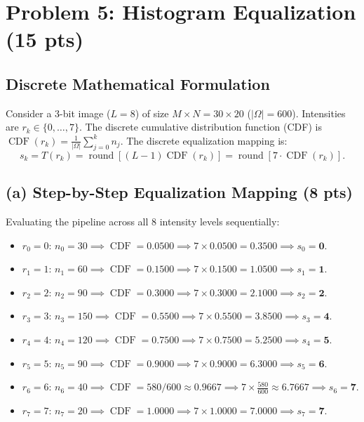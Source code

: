 \documentclass[11pt,a4paper]{article}
\begin{document}
\section{Problem 5: Histogram Equalization (15 pts)}

\subsection{Discrete Mathematical Formulation}
Consider a 3-bit image ($L = 8$) of size $M \times N = 30 \times 20$ ($|\Omega| = 600$). Intensities are $r_k \in \{0, \dots, 7\}$. The discrete cumulative distribution function (CDF) is $\operatorname{CDF}(r_k) = \frac{1}{|\Omega|} \sum_{j=0}^k n_j$. The discrete equalization mapping is:
\begin{equation}
s_k = T(r_k) = \operatorname{round}\left[ (L - 1) \operatorname{CDF}(r_k) \right] = \operatorname{round}\left[ 7 \cdot \operatorname{CDF}(r_k) \right].
\end{equation}

\subsection{(a) Step-by-Step Equalization Mapping (8 pts)}
Evaluating the pipeline across all 8 intensity levels sequentially:
\begin{itemize}
    \item $r_0 = 0: \, n_0 = 30 \implies \operatorname{CDF} = 0.0500 \implies 7 \times 0.0500 = 0.3500 \implies s_0 = \mathbf{0}$.
    \item $r_1 = 1: \, n_1 = 60 \implies \operatorname{CDF} = 0.1500 \implies 7 \times 0.1500 = 1.0500 \implies s_1 = \mathbf{1}$.
    \item $r_2 = 2: \, n_2 = 90 \implies \operatorname{CDF} = 0.3000 \implies 7 \times 0.3000 = 2.1000 \implies s_2 = \mathbf{2}$.
    \item $r_3 = 3: \, n_3 = 150 \implies \operatorname{CDF} = 0.5500 \implies 7 \times 0.5500 = 3.8500 \implies s_3 = \mathbf{4}$.
    \item $r_4 = 4: \, n_4 = 120 \implies \operatorname{CDF} = 0.7500 \implies 7 \times 0.7500 = 5.2500 \implies s_4 = \mathbf{5}$.
    \item $r_5 = 5: \, n_5 = 90 \implies \operatorname{CDF} = 0.9000 \implies 7 \times 0.9000 = 6.3000 \implies s_5 = \mathbf{6}$.
    \item $r_6 = 6: \, n_6 = 40 \implies \operatorname{CDF} = 580/600 \approx 0.9667 \implies 7 \times \frac{580}{600} \approx 6.7667 \implies s_6 = \mathbf{7}$.
    \item $r_7 = 7: \, n_7 = 20 \implies \operatorname{CDF} = 1.0000 \implies 7 \times 1.0000 = 7.0000 \implies s_7 = \mathbf{7}$.
\end{itemize}
\end{document}
